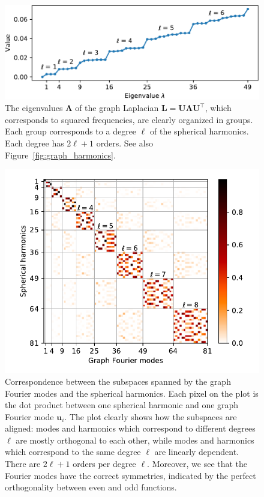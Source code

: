 \documentclass[final,twocolumn,3p,times,authoryear]{elsarticle}
\newcommand{\figref}[1]{Figure~\ref{fig:#1}}
\renewcommand{\b}[1]{{\bm{#1}}}   %
\newcommand{\1}{\b{1}}              %
\newcommand{\0}{\b{0}}              %
\renewcommand{\L}{\b{L}}
\newcommand{\U}{\b{U}}
\newcommand{\trans}{^\intercal}
\newcommand{\bLambda}{\b{\Lambda}}
\begin{document}
\begin{figure}
	\centering
	\includegraphics[width=\linewidth]{graph_eigenvalues}
	\caption{The eigenvalues $\bLambda$ of the graph Laplacian $\L = \U \bLambda \U\trans$, which corresponds to squared frequencies, are clearly organized in groups. Each group corresponds to a degree $\ell$ of the spherical harmonics. Each degree has $2\ell + 1$ orders. See also \figref{graph_harmonics}.}
	\label{fig:graph_eigenvalues}
\end{figure}

\begin{figure}
	\centering
	\includegraphics[width=\linewidth]{subspace_harmonics_eigenvectors}
	\caption{Correspondence between the subspaces spanned by the graph Fourier modes and the spherical harmonics. Each pixel on the plot is the dot product between one spherical harmonic and one graph Fourier mode $\b u_i$. The plot clearly shows how the subspaces are aligned: modes and harmonics which correspond to different degrees $\ell$ are mostly orthogonal to each other, while modes and harmonics which correspond to the same degree $\ell$ are linearly dependent. There are $2 \ell + 1$ orders per degree $\ell$. Moreover, we see that the Fourier modes have the correct symmetries, indicated by the perfect orthogonality between even and odd functions.}
	\label{fig:subspace_harmonics_eigenvectors}
\end{figure}
\end{document}
